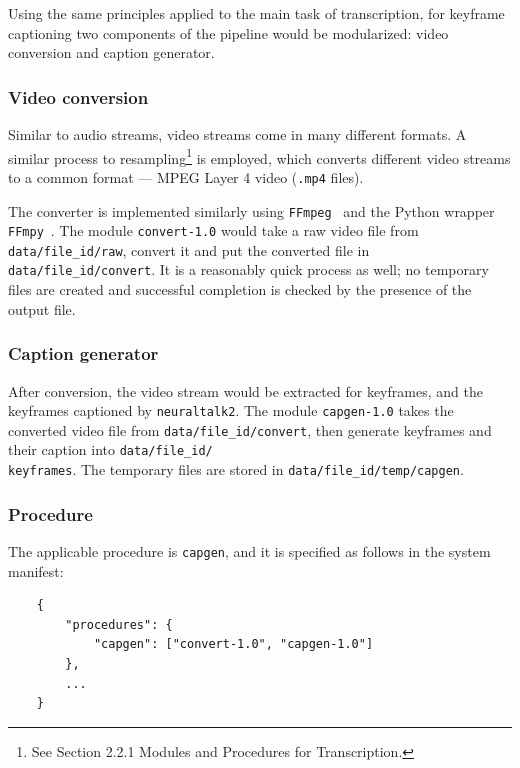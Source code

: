 Using the same principles applied to the main task of transcription, for keyframe
captioning two components of the pipeline would be modularized: video conversion
and caption generator.

\subsubsection{Video conversion}

Similar to audio streams, video streams come in many different formats. A similar
process to resampling\footnote{See Section 2.2.1 Modules and Procedures for
Transcription.} is employed, which converts different video streams to a common
format --- MPEG Layer 4 video (\texttt{.mp4} files).

The converter is implemented similarly using \texttt{FFmpeg}~\cite{ffmpeg} and the
Python wrapper \texttt{FFmpy}~\cite{ffmpy}. The module \texttt{convert-1.0} would
take a raw video file from \texttt{data/file\_id/raw}, convert it and put the
converted file in \texttt{data/file\_id/convert}. It is a reasonably quick process
as well; no temporary files are created and successful completion is checked by the
presence of the output file.

\subsubsection{Caption generator}

After conversion, the video stream would be extracted for keyframes, and the 
keyframes captioned by \texttt{neuraltalk2}. The module \texttt{capgen-1.0} takes
the converted video file from \texttt{data/file\_id/convert}, then generate
keyframes and their caption into \texttt{data/file\_id/\\ keyframes}. The
temporary files are stored in \texttt{data/file\_id/temp/capgen}.

\subsubsection{Procedure}

The applicable procedure is \texttt{capgen}, and it is specified as follows in
the system manifest:

\begin{lstlisting}
    {
        "procedures": {
            "capgen": ["convert-1.0", "capgen-1.0"]
        },
        ...
    }
\end{lstlisting}